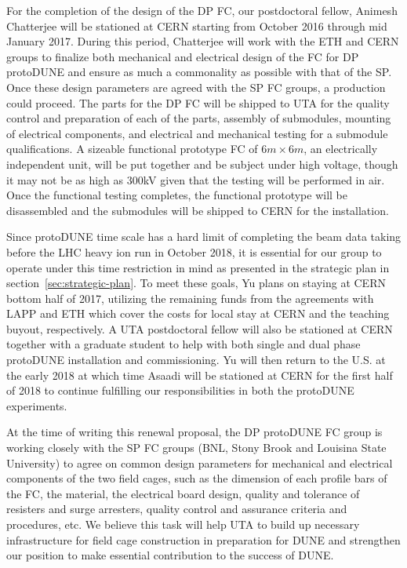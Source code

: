 For the completion of the design of the DP FC, our postdoctoral fellow, Animesh Chatterjee will be stationed at CERN starting from October 2016 through mid January 2017.   During this period, Chatterjee will work with the ETH and CERN groups to finalize both mechanical and electrical design of the FC for DP protoDUNE and ensure as much a commonality as possible with that of the SP.  Once these design parameters are agreed with the SP FC groups, a production could proceed.  The parts for the DP FC will be shipped to UTA for the quality control and preparation of each of the parts, assembly of submodules, mounting of electrical components, and electrical and mechanical testing for a submodule qualifications. A sizeable functional prototype FC of $6m\times 6m$, an electrically independent unit, will be put together and be subject under high voltage, though it may not be as high as 300kV given that the testing will be performed in air.  Once the functional testing completes, the functional prototype will be disassembled and the submodules will be shipped to CERN for the installation.

Since protoDUNE time scale has a hard limit of completing the beam data taking before the LHC heavy ion run in October 2018, it is essential for our group to operate under this time restriction in mind as presented in the strategic plan in section~\ref{sec:strategic-plan}.  To meet these goals, Yu plans on staying at CERN bottom half of 2017, utilizing the remaining funds from the agreements with LAPP and ETH which cover the costs for local stay at CERN and the teaching buyout, respectively.  A UTA postdoctoral fellow will also be stationed at CERN together with a graduate student to help with both single and dual phase protoDUNE installation and commissioning.   Yu will then return to the U.S. at the early 2018 at which time Asaadi will be stationed at CERN for the first half of 2018 to continue fulfilling our responsibilities in both the protoDUNE experiments.

At the time of writing this renewal proposal, the DP protoDUNE FC group is working closely with the SP FC groups (BNL, Stony Brook and Louisina State University) to agree on common design parameters for mechanical and electrical components of the two field cages, such as the dimension of each profile bars of the FC, the material, the electrical board design, quality and tolerance of resisters and surge arresters, quality control and assurance criteria and procedures, etc.  We believe this task will help UTA to build up necessary infrastructure for field cage construction in preparation for DUNE and strengthen our position to make essential contribution to the success of DUNE.
